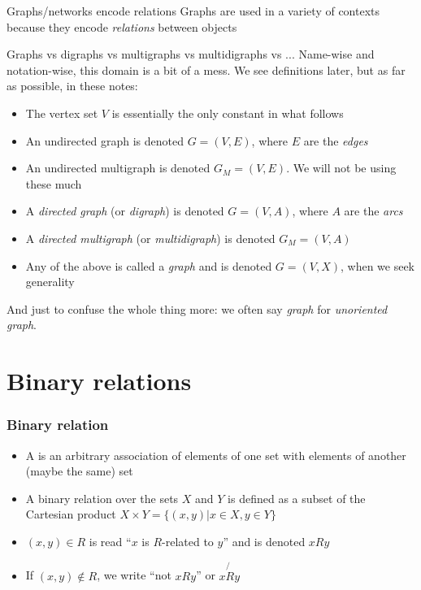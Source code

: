 \documentclass[aspectratio=43]{beamer}
\begin{document}
\begin{frame}{Graphs/networks encode relations}
	Graphs are used in a variety of contexts because they encode \emph{relations} between objects
\end{frame}



\begin{frame}{Graphs vs digraphs vs multigraphs vs multidigraphs vs ...}
	Name-wise and notation-wise, this domain is a bit of a mess. We see definitions later, but as far as possible, in these notes:
	\begin{itemize}
		\item The vertex set $V$ is essentially the only constant in what follows
		\item An undirected graph is denoted $G=(V,E)$, where $E$ are the \emph{edges}
		\item An undirected multigraph is denoted $G_M=(V,E)$. We will not be using these much
		\item A \emph{directed graph} (or \emph{digraph}) is denoted $G=(V,A)$, where $A$ are the \emph{arcs}
		\item A \emph{directed multigraph} (or \emph{multidigraph}) is denoted $G_M=(V,A)$
		\item Any of the above is called a \emph{graph} and is denoted $G=(V,X)$, when we seek generality
	\end{itemize}
And just to confuse the whole thing more: we often say \emph{graph} for \emph{unoriented graph}.
\end{frame}

\section{Binary relations}

\begin{frame}\frametitle{Binary relation}
	\begin{definition}
	\begin{itemize}
	\item A  is an arbitrary association of elements of one set with elements of another (maybe the same) set
	\item  A binary relation over the sets $X$ and $Y$ is defined as a subset of the Cartesian product $X\times Y =\{(x,y)| x\in X , y\in Y\}$
	\item $(x,y)\in R$ is read ``$x$ is $R$-related to $y$'' and is denoted $xRy$
	\item If $(x,y)\not\in R$, we write ``not $x R y$'' or $x\not{R} y$
	\end{itemize}
	\end{definition}
\end{frame}
	
\end{document}
